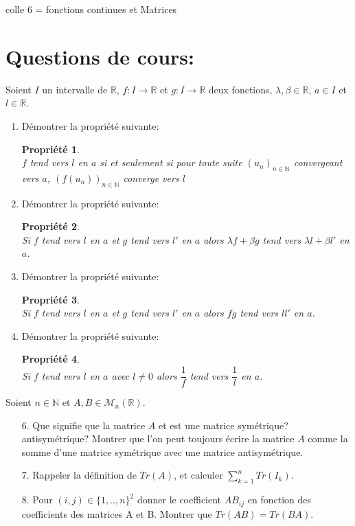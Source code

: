 \documentclass[a4paper,10pt]{article}
\newtheorem*{pro}{Propriété}
\theoremstyle{definition}
\theoremstyle{definition}
\newcommand{\R}{\mathbb{R}}
\newcommand{\N}{\mathbb{N}}
\begin{document}
	
	
	\begin{center}
		\Large \sc colle 6 = fonctions continues et Matrices
	\end{center}
	
\section *{Questions de cours:}
\noindent Soient $I$ un intervalle de $\R$, $f:I\rightarrow\R$ et $g:I\rightarrow\R$ deux fonctions, $\lambda,\beta\in\R$,  $a\in I$ et $l\in\R$.
\begin{enumerate}
\item Démontrer la propriété suivante:
\begin{pro}\hfil\\
$f$ tend vers $l$  en $a$ si et seulement si  pour toute suite $(u_n)_{n\in\N}$ convergeant vers $a$, $(f(u_n))_{n\in\N}$ converge vers $l$
\end{pro} 
\item  Démontrer la propriété suivante:
\begin{pro}\hfil\\
Si $f$ tend vers $l$  en $a$ et $g$ tend vers $l'$  en $a$   alors $\lambda f+\beta g$ tend vers $\lambda l+ \beta l'$ en $a$.
\end{pro} 
\item  Démontrer la propriété suivante:
\begin{pro}\hfil\\
Si $f$ tend vers $l$  en $a$ et $g$ tend vers $l'$  en $a$   alors $fg$ tend vers $ll'$ en $a$.
\end{pro}
\item  Démontrer la propriété suivante:
\begin{pro}\hfil\\
Si $f$ tend vers $l$  en $a$ avec $l\neq 0$   alors $\dfrac{1}{f}$ tend vers $\dfrac{1}{l}$  en $a$.
\end{pro} 
\end{enumerate}
\noindent Soient $n\in\N$ et  $A,B\in\mathcal{M}_{n}\left(\R\right)$.
\begin{enumerate} 
\item[6.]Que signifie que la matrice $A$ et est une matrice symétrique? antisymétrique? Montrer que l'on peut toujours écrire la matrice $A$ comme la somme d'une matrice symétrique avec une matrice antisymétrique. 
\item[7.] Rappeler la définition de $Tr(A)$, et calculer $\sum_{k=1}^{n}Tr(I_k)$.
\item[8.] Pour $(i,j)\in\{1,..,n\}^2$ donner le coefficient $AB_{ij}$ en fonction des coefficients des matrices A et B. Montrer que $Tr(AB) = Tr(BA)$.
\end{enumerate}
\end{document}
